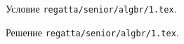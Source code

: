 Условие \texttt{regatta/senior/algbr/1.tex}.

\solution Решение \texttt{regatta/senior/algbr/1.tex}.
